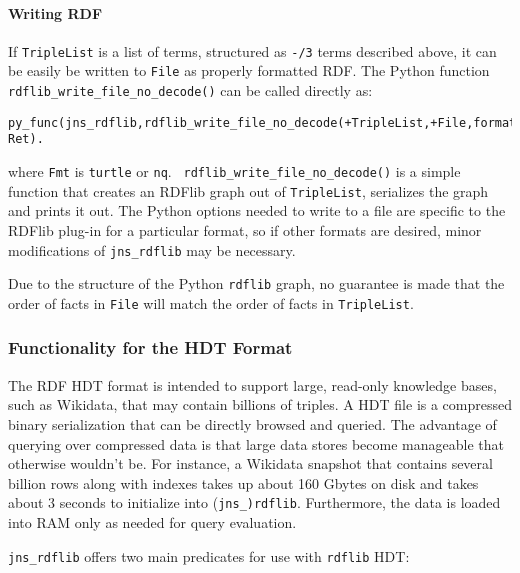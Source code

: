 \paragraph{Writing RDF}

If {\tt TripleList} is a list of terms, structured as {\tt -/3} terms
described above, it can be easily be written to {\tt File} as properly
formatted RDF.  The Python function {\tt
  rdflib\_write\_file\_no\_decode()} can be called directly as:
{\small
\begin{verbatim}
py_func(jns_rdflib,rdflib_write_file_no_decode(+TripleList,+File,format=+Fmt),-Ret).
\end{verbatim}
}
\noindent
where {\tt Fmt} is {\tt turtle} or {\tt nq}.  {\tt
  rdflib\_write\_file\_no\_decode()} is a simple function that creates
an RDFlib graph out of {\tt TripleList}, serializes the graph and
prints it out.  The Python options needed to write to a file are
specific to the RDFlib plug-in for a particular format, so if other
formats are desired, minor modifications of {\tt jns\_rdflib} may be
necessary.

Due to the structure of the Python {\tt rdflib} graph, no guarantee is
made that the order of facts in {\tt File} will match the order of
facts in {\tt TripleList}.
  
\subsubsection{Functionality for the HDT Format}

The RDF HDT format is intended to support large, read-only knowledge
bases, such as Wikidata, that may contain billions of triples.  A HDT
file is a compressed binary serialization that can be directly browsed
and queried.  The advantage of querying over compressed data is that
large data stores become manageable that otherwise wouldn't be.  For
instance, a Wikidata snapshot that contains several billion rows along
with indexes takes up about 160 Gbytes on disk and takes about 3
seconds to initialize into ({\tt jns\_}{\tt )rdflib}.  Furthermore,
the data is loaded into RAM only as needed for query evaluation.

{\tt jns\_rdflib} offers two main predicates for use with {\tt rdflib}
HDT:

